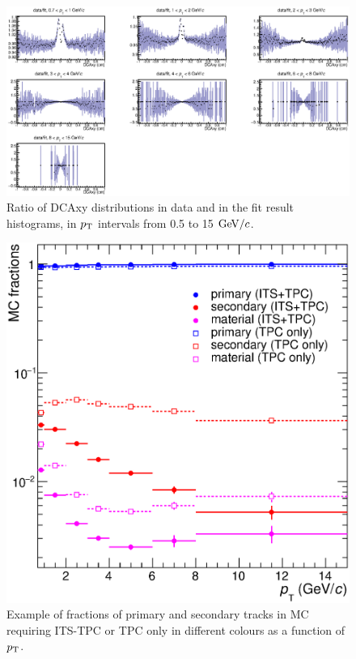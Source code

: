 \begin{figure}[!htb]
\begin{center}
\includegraphics[width=.99\textwidth]{FigCap4/DataOverFit.eps}
\caption{Ratio of DCAxy distributions in data and in the fit result histograms, in $p_{\rm T}$ intervals from 0.5 to 15 $\mathrm{GeV}/c$.}
\label{fig:DCAxyRatioDataFitVsPt}
\end{center}
\end{figure}

\begin{figure}[!htb]
\begin{center}
\includegraphics[width=.50\textwidth]{FigCap4/MCfractions_ESDTrOnly_VsPt_PiK.eps}
\caption{Example of fractions of primary and secondary tracks in MC requiring ITS-TPC or TPC only in different colours as a function of $p_{\rm T}$.}
\label{fig:MCfractions}
\end{center}
\end{figure}

